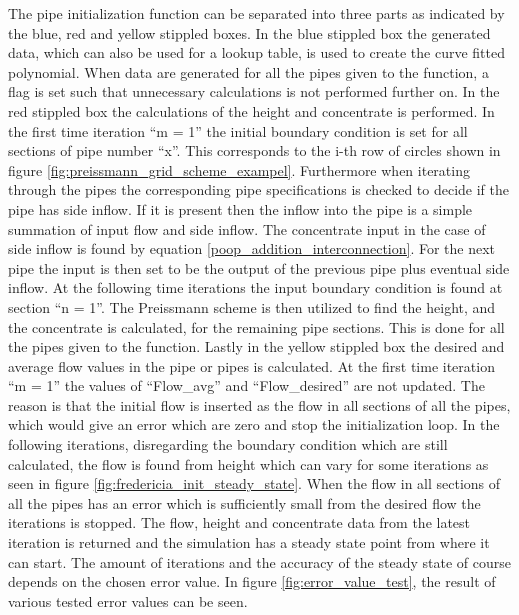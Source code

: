 {The pipe initialization function can be separated into three parts as indicated by the blue, red and yellow stippled boxes. In the blue stippled box the generated data, which can also be used for a lookup table, is used to create the curve fitted polynomial. 
When data are generated for all the pipes given to the function, a flag is set such that unnecessary calculations is not performed further on. In the red stippled box the calculations of the height and concentrate is performed. In the first time iteration ``m = 1'' the initial boundary condition is set for all sections of pipe number ``x''. This corresponds to the i-th row of circles shown in figure \ref{fig:preissmann_grid_scheme_exampel}. Furthermore when iterating through the pipes the corresponding pipe specifications is checked to decide if the pipe has side inflow. If it is present then the inflow into the pipe is a simple summation of input flow and side inflow. The concentrate input in the case of side inflow is found by equation \ref{poop_addition_interconnection}.
For the next pipe the input is then set to be the output of the previous pipe plus eventual side inflow.%
At the following time iterations the input boundary condition is found at section ``n = 1''. The Preissmann scheme is then utilized to find the height, and the concentrate is calculated, for the remaining pipe sections. This is done for all the pipes given to the function.
Lastly in the yellow stippled box the desired and average flow values in the pipe or pipes is calculated. At the first time iteration ``m = 1'' the values of ``Flow\_avg'' and ``Flow\_desired'' are not updated. The reason is that the initial flow is inserted as the flow in all sections of all the pipes, which would give an error which are zero and stop the initialization loop. In the following iterations, disregarding the boundary condition which are still calculated, the flow is found from height which can vary for some iterations as seen in figure \ref{fig:fredericia_init_steady_state}. When the flow in all sections of all the pipes has an error which is sufficiently small from the desired flow the iterations is stopped. The flow, height and concentrate data from the latest iteration is returned and the simulation has a steady state point from where it can start. The amount of iterations and the accuracy of the steady state of course depends on the chosen error value. In figure \ref{fig:error_value_test}, the result of various tested error values can be seen.

}
